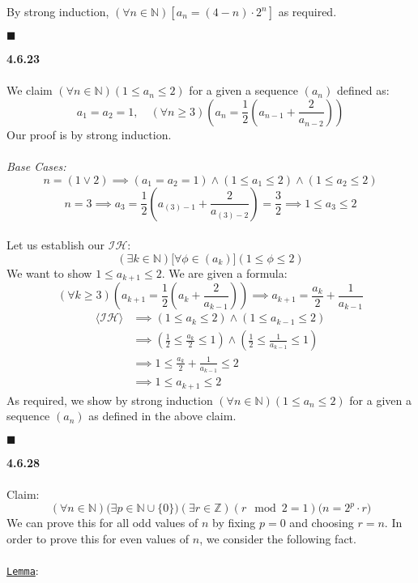 \documentclass[12pt]{article}
\begin{document}
By strong induction, $( \forall n \in \mathbb{N})[a_n = (4-n) \cdot 2^n]$ as required.
\begin{flushright}
$\blacksquare$
\end{flushright}
\pagebreak
\textbf{4.6.23}\\\\
We claim $(\forall n \in \mathbb{N})(1 \leq a_n \leq 2)$ for a given a sequence $(a_n)$ defined as:
$$a_1=a_2=1, \quad (\forall n \geq 3)\left(a_n=\frac{1}{2}\left(a_{n-1}+\frac{2}{a_{n-2}}\right)\right)$$
Our proof is by strong induction.\\\\
\emph{Base Cases:}
$$\boxed{n=(1 \lor 2) \implies (a_1=a_2=1) \land (1 \leq a_1 \leq 2) \land (1 \leq a_2 \leq 2)}$$
$$\boxed{n=3 \implies a_3 = \frac{1}{2} \left(a_{(3)-1}+\frac{2}{a_{(3)-2}} \right) = \frac{3}{2} \implies 1 \leq a_3 \leq 2}$$
\quad\\
Let us establish our $\mathcal{IH}$:
$$(\exists k \in \mathbb{N})\Big[\forall \phi \in (a_k)\Big](1 \leq \phi \leq 2)$$
We want to show $1 \leq a_{k+1} \leq 2$. We are given a formula:
$$(\forall k \geq 3)\left(a_{k+1}=\frac{1}{2}\left(a_k+\frac{2}{a_{k-1}}\right)\right)\implies a_{k+1} = \frac{a_k}{2}+\frac{1}{a_{k-1}}$$
\begin{align*}
\langle \mathcal{IH} \rangle &\implies (1 \leq a_k \leq 2) \land (1 \leq a_{k-1} \leq 2)\\
&\implies \left(\frac{1}{2}\leq \frac{a_k}{2}\leq 1\right)\land \left(\frac{1}{2}\leq \frac{1}{a_{k-1}}\leq 1\right)\\
&\implies 1 \leq \frac{a_k}{2}+\frac{1}{a_{k-1}} \leq 2\\
&\implies 1 \leq a_{k+1} \leq 2
\end{align*}
As required, we show by strong induction $(\forall n \in \mathbb{N})(1 \leq a_n \leq 2)$ for a given a sequence $(a_n)$ as defined in the above claim.
\begin{flushright}
$\blacksquare$
\end{flushright}
\pagebreak
\textbf{4.6.28}\\\\
Claim:
$$(\forall n \in \mathbb{N})\Big(\exists p \in \mathbb{N}\cup \{0\}\Big)(\exists r \in \mathbb{Z})(r \mod 2 = 1)\Big(n=2^p \cdot r \Big)$$
We can prove this for all odd values of $n$ by fixing $p=0$ and choosing $r=n$. In order to prove this for even values of $n$, we consider the following fact.\\\\
\underline{\texttt{Lemma}}:\\\\
\end{document}

